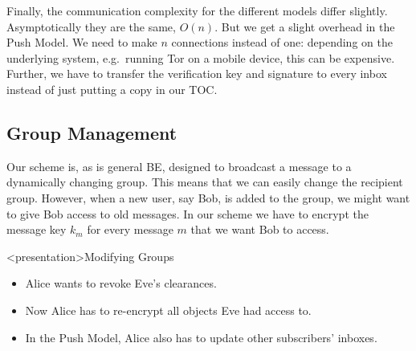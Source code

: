 Finally, the communication complexity for the different models differ slightly.
Asymptotically they are the same, \(O(n)\).
But we get a slight overhead in the Push Model.
We need to make \(n\) connections instead of one: depending on the underlying 
system, e.g.\ running Tor on a mobile device, this can be expensive.
Further, we have to transfer the verification key and signature to every inbox 
instead of just putting a copy in our \ac{TOC}.

\subsection{Group Management}\label{sec:GroupManagement}


Our scheme is, as is general \ac{BE}, designed to broadcast a message to 
a dynamically changing group.
This means that we can easily change the recipient group.
However, when a new user, say Bob, is added to the group, we might want to give 
Bob access to old messages.
In our scheme we have to encrypt the message key \(k_m\) for every message 
\(m\) that we want Bob to access.

\begin{frame}<presentation>{Modifying Groups}
  \begin{itemize}
    \item Alice wants to revoke Eve's clearances.

      \pause{}

    \item Now Alice has to re-encrypt all objects Eve had access to.

    \item In the Push Model, Alice also has to update other subscribers' 
      inboxes.

  \end{itemize}
\end{frame}

